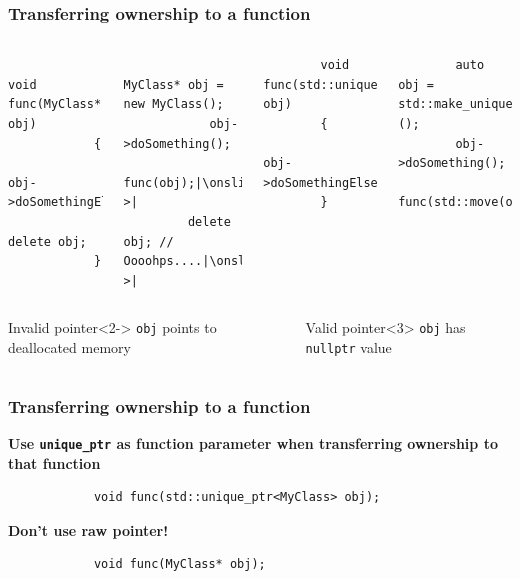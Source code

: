 \documentclass{beamer}
\begin{document}
\begin{frame}[fragile,t]
\frametitle{Transferring ownership to a function}
	\begin{columns}[T]
		\begin{lstlisting}
			void func(MyClass* obj)
			{
				obj->doSomethingElse();
				delete obj;
			}
		\end{lstlisting}
		\begin{lstlisting}
			MyClass* obj = new MyClass();
			obj->doSomething();
			func(obj);|\onslide<2->|
         delete obj; // Oooohps....|\onslide<1->|
		\end{lstlisting}

    \begin{lstlisting}
        void func(std::unique_ptr<MyClass> obj)
        {
            obj->doSomethingElse();		
        }
    \end{lstlisting}
    \begin{lstlisting}
        auto obj = std::make_unique<MyClass>();
        obj->doSomething();
        func(std::move(obj));		
    \end{lstlisting}
	\end{columns}

	\begin{columns}[T]
        \begin{alertblock}{Invalid pointer}<2->
            \texttt{obj} points to deallocated memory
        \end{alertblock}
        \begin{block}{Valid pointer}<3>
            \texttt{obj} has \texttt{nullptr} value
        \end{block}
	\end{columns}
\end{frame}

\begin{frame}[fragile,t]
\frametitle{Transferring ownership to a function}
	\textbf{Use \texttt{unique\_ptr} as function parameter when transferring
		    ownership to that function}
	\begin{example}
		\begin{lstlisting}
			void func(std::unique_ptr<MyClass> obj);
		\end{lstlisting}
	\end{example}
	\textbf{Don't use raw pointer!}
	\begin{example}
		\begin{lstlisting}
			void func(MyClass* obj);
		\end{lstlisting}
	\end{example}
\end{frame}
\end{document}
